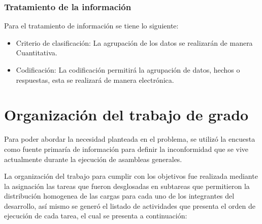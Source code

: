 \subsubsection{Tratamiento de la información}

Para el tratamiento de información se tiene lo siguiente:

\begin{itemize}
	\item Criterio de clasificación: La agrupación de los datos se realizarán de manera Cuantitativa.
	
	\item Codificación: La codificación permitirá la agrupación de datos, hechos o respuestas, esta se realizará de manera electrónica.
\end{itemize}

\section{Organización del trabajo de grado}

Para poder abordar la necesidad planteada en el problema, se utilizó la encuesta como fuente primaría de información para definir la inconformidad que se vive actualmente durante la ejecución de asambleas generales.

La organización del trabajo para cumplir con los objetivos fue realizada mediante la asignación las tareas que fueron desglosadas en subtareas que permitieron la distribución homogenea de las cargas para cada uno de los integrantes del desarrollo, así mismo se generó el listado de actividades que presenta el orden de ejecución de cada tarea, el cual se presenta a continuación:

